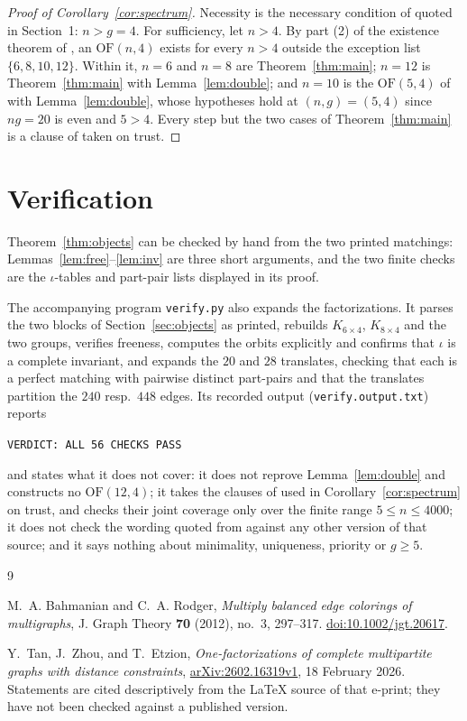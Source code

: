 \documentclass[11pt]{amsart}
\theoremstyle{remark}
\newcommand{\OF}{\mathrm{OF}}
\newcommand{\Km}[2]{K_{#1\times #2}}
\begin{document}
\begin{proof}[Proof of Corollary~\ref{cor:spectrum}]
Necessity is the necessary condition of \cite{TZE} quoted in Section~1:
$n>g=4$. For sufficiency, let $n>4$. By part (2) of the existence theorem of
\cite{TZE}, an $\OF(n,4)$ exists for every $n>4$ outside the exception list
$\{6,8,10,12\}$. Within it, $n=6$ and $n=8$ are Theorem~\ref{thm:main};
$n=12$ is Theorem~\ref{thm:main} with Lemma~\ref{lem:double}; and $n=10$ is
the $\OF(5,4)$ of \cite{TZE} with Lemma~\ref{lem:double}, whose hypotheses hold
at $(n,g)=(5,4)$ since $ng=20$ is even and $5>4$. Every step but the two cases
of Theorem~\ref{thm:main} is a clause of \cite{TZE} taken on trust.
\end{proof}

\section{Verification}

Theorem~\ref{thm:objects} can be checked by hand from the two printed matchings:
Lemmas~\ref{lem:free}--\ref{lem:inv} are three short arguments, and the two
finite checks are the $\iota$-tables and part-pair lists displayed in its proof.

The accompanying program \texttt{verify.py} also expands the factorizations. It
parses the two blocks of Section~\ref{sec:objects} as printed, rebuilds $\Km64$,
$\Km84$ and the two groups, verifies freeness, computes the orbits explicitly
and confirms that $\iota$ is a complete invariant, and expands the $20$ and $28$
translates, checking that each is a perfect matching with pairwise distinct
part-pairs and that the translates partition the $240$ resp.\ $448$ edges. Its
recorded output (\texttt{verify.output.txt}) reports

\begin{center}
\texttt{VERDICT: ALL 56 CHECKS PASS}
\end{center}

\noindent
and states what it does not cover: it does not reprove Lemma~\ref{lem:double}
and constructs no $\OF(12,4)$; it takes the clauses of \cite{TZE} used in
Corollary~\ref{cor:spectrum} on trust, and checks their joint coverage only over
the finite range $5\le n\le4000$; it does not check the wording quoted from
\cite{TZE} against any other version of that source; and it says nothing about
minimality, uniqueness, priority or $g\ge5$.

\begin{thebibliography}{9}

M.~A. Bahmanian and C.~A. Rodger,
\emph{Multiply balanced edge colorings of multigraphs},
J. Graph Theory \textbf{70} (2012), no.~3, 297--317.
\href{https://doi.org/10.1002/jgt.20617}{doi:10.1002/jgt.20617}.

Y.~Tan, J.~Zhou, and T.~Etzion,
\emph{One-factorizations of complete multipartite graphs with distance
constraints},
\href{https://arxiv.org/abs/2602.16319v1}{arXiv:2602.16319v1}, 18 February
2026. Statements are cited descriptively from the \LaTeX{} source of that
e-print; they have not been checked against a published version.

\end{thebibliography}
\end{document}
